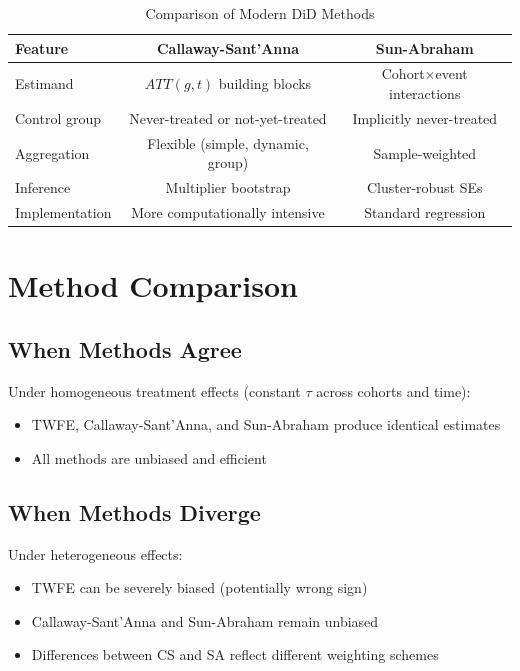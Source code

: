 \begin{table}[htbp]
\centering
\caption{Comparison of Modern DiD Methods}
\label{tab:modern_did_comparison}
\begin{tabular}{lcc}
\toprule
\textbf{Feature} & \textbf{Callaway-Sant'Anna} & \textbf{Sun-Abraham} \\
\midrule
Estimand & $ATT(g, t)$ building blocks & Cohort$\times$event interactions \\
Control group & Never-treated or not-yet-treated & Implicitly never-treated \\
Aggregation & Flexible (simple, dynamic, group) & Sample-weighted \\
Inference & Multiplier bootstrap & Cluster-robust SEs \\
Implementation & More computationally intensive & Standard regression \\
\bottomrule
\end{tabular}
\end{table}

\section{Method Comparison}
\label{sec:modern_comparison}

\subsection{When Methods Agree}

Under homogeneous treatment effects (constant $\tau$ across cohorts and time):
\begin{itemize}
    \item TWFE, Callaway-Sant'Anna, and Sun-Abraham produce identical estimates
    \item All methods are unbiased and efficient
\end{itemize}

\subsection{When Methods Diverge}

Under heterogeneous effects:
\begin{itemize}
    \item TWFE can be severely biased (potentially wrong sign)
    \item Callaway-Sant'Anna and Sun-Abraham remain unbiased
    \item Differences between CS and SA reflect different weighting schemes
\end{itemize}

